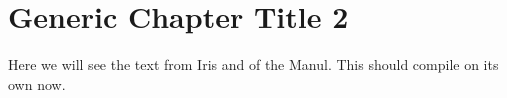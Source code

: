\section{Generic Chapter Title 2}
Here we will see the text from Iris and of the Manul.
This should compile on its own now.